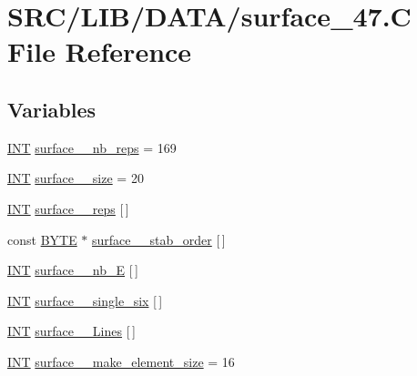 \hypertarget{surface__47_8_c}{}\section{S\+R\+C/\+L\+I\+B/\+D\+A\+T\+A/surface\+\_\+47.C File Reference}
\label{surface__47_8_c}
\subsection*{Variables}
\begin{DoxyCompactItemize}
\item 
\mbox{\hyperlink{galois_8h_a09fddde158a3a20bd2dcadb609de11dc}{I\+NT}} \mbox{\hyperlink{surface__47_8_c_a192ab06be18889cd107b36fa07d7490d}{surface\+\_\+\_\+nb\+\_\+reps}} = 169
\item 
\mbox{\hyperlink{galois_8h_a09fddde158a3a20bd2dcadb609de11dc}{I\+NT}} \mbox{\hyperlink{surface__47_8_c_aaec2d7cde7c8d4ebcf10a575456653a1}{surface\+\_\+\_\+size}} = 20
\item 
\mbox{\hyperlink{galois_8h_a09fddde158a3a20bd2dcadb609de11dc}{I\+NT}} \mbox{\hyperlink{surface__47_8_c_a7ef3524245a04553edf39073b4d22adf}{surface\+\_\+\_\+reps}} \mbox{[}$\,$\mbox{]}
\item 
const \mbox{\hyperlink{galois_8h_ab6cc7b4aeb6ea31aba2b3fbfc83ff5e6}{B\+Y\+TE}} $\ast$ \mbox{\hyperlink{surface__47_8_c_a12eac70c2c8d947898ee581702a92e2b}{surface\+\_\+\_\+stab\+\_\+order}} \mbox{[}$\,$\mbox{]}
\item 
\mbox{\hyperlink{galois_8h_a09fddde158a3a20bd2dcadb609de11dc}{I\+NT}} \mbox{\hyperlink{surface__47_8_c_a28f7085424b2880a249384d131b2d762}{surface\+\_\+\_\+nb\+\_\+E}} \mbox{[}$\,$\mbox{]}
\item 
\mbox{\hyperlink{galois_8h_a09fddde158a3a20bd2dcadb609de11dc}{I\+NT}} \mbox{\hyperlink{surface__47_8_c_a2ec9ed5cfc1a51565fe14bbfdd139780}{surface\+\_\+\_\+single\+\_\+six}} \mbox{[}$\,$\mbox{]}
\item 
\mbox{\hyperlink{galois_8h_a09fddde158a3a20bd2dcadb609de11dc}{I\+NT}} \mbox{\hyperlink{surface__47_8_c_a29a0905b8c661c786476489ccb0959f3}{surface\+\_\+\_\+\+Lines}} \mbox{[}$\,$\mbox{]}
\item 
\mbox{\hyperlink{galois_8h_a09fddde158a3a20bd2dcadb609de11dc}{I\+NT}} \mbox{\hyperlink{surface__47_8_c_a85e930ea1a434769feb141f7dc6f5836}{surface\+\_\+\_\+make\+\_\+element\+\_\+size}} = 16
\item 

\end{DoxyCompactItemize}
